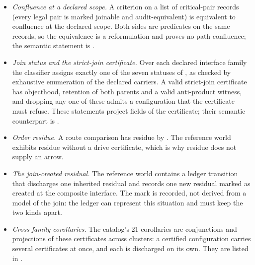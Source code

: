 \begin{itemize}
        budgets and residual obligations) are not needed for associativity; they govern
        whether a composed chain earns credit. A two-link chain whose result depends on the
        order of its links is exhibited.
  \item \emph{Confluence at a declared scope.} A criterion on a list of critical-pair
        records (every legal pair is marked joinable and audit-equivalent) is equivalent to
        confluence at the declared scope. Both sides are predicates on the same records,
        so the equivalence is a reformulation and proves no path confluence; the semantic
        statement is .
  \item \emph{Join status and the strict-join certificate.} Over each declared interface
        family the classifier assigns exactly one of the seven statuses of
        , as checked by exhaustive enumeration of the declared
        carriers. A valid strict-join certificate has objecthood, retention of both
        parents and a valid anti-product witness, and dropping any one of these admits a
        configuration that the certificate must refuse. These statements project fields of
        the certificate; their semantic counterpart is .
  \item \emph{Order residue.} A route comparison has residue by . The
        reference world exhibits residue without a drive certificate, which is why residue
        does not supply an arrow.
  \item \emph{The join-created residual.} The reference world contains a ledger
        transition that discharges one inherited residual and records one new residual
        marked as created at the composite interface. The mark is recorded, not derived
        from a model of the join: the ledger can represent this situation and must keep
        the two kinds apart.
  \item \emph{Cross-family corollaries.} The catalog's 21 corollaries are conjunctions and
        projections of these certificates across clusters: a certified configuration
        carries several certificates at once, and each is discharged on its own. They are
        listed in .
\end{itemize}
